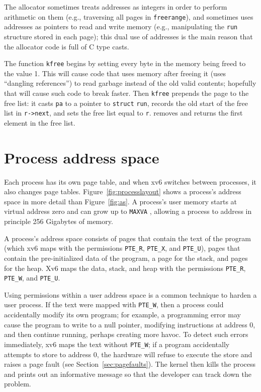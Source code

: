 The allocator sometimes treats addresses as integers
in order to perform arithmetic on them (e.g.,
traversing all pages in
\lstinline{freerange}),
and sometimes uses addresses as pointers to read and
write memory (e.g., manipulating the
\lstinline{run}
structure stored in each page);
this dual use of addresses is the main reason that the
allocator code is full of C type casts.

The function
\lstinline{kfree}
begins by setting every byte in the
memory being freed to the value 1.
This will cause code that uses memory after freeing it
(uses ``dangling references'')
to read garbage instead of the old valid contents;
hopefully that will cause such code to break faster.
Then
\lstinline{kfree}
prepends the page to the free list:
it casts
\lstinline{pa}
to a pointer to
\lstinline{struct}
\lstinline{run},
records the old start of the free list in
\lstinline{r->next},
and sets the free list equal to
\lstinline{r}.
removes and returns the first element in the free list.

\section{Process address space}

Each process has its own page table, and when xv6 switches between
processes, it also changes page tables.
Figure~\ref{fig:processlayout} shows a process's address space in more
detail than Figure~\ref{fig:as}.  A process's user memory starts at
virtual address zero and can grow up to \texttt{MAXVA}
, allowing a process to address in
principle 256 Gigabytes of memory.

A process's address space consists of pages that contain the text of
the program (which xv6 maps with the permissions \lstinline{PTE_R},
\lstinline{PTE_X}, and \lstinline{PTE_U}), pages that contain the
pre-initialized data of the program, a page for the stack, and pages
for the heap.  Xv6 maps the data, stack, and heap with the permissions
\lstinline{PTE_R}, \lstinline{PTE_W}, and \lstinline{PTE_U}.

Using permissions within a user address space is a common technique to
harden a user process.  If the text were mapped with
\lstinline{PTE_W}, then a process could accidentally modify its own
program; for example, a programming error may cause the program to
write to a null pointer, modifying instructions at address 0, and then
continue running, perhaps creating more havoc.  To detect such errors
immediately, xv6 maps the text without \lstinline{PTE_W}; if a program
accidentally attempts to store to address 0, the hardware will refuse
to execute the store and raises a page fault (see
Section~\ref{sec:pagefaults}).  The kernel then kills the process and
prints out an informative message so that the developer can track down
the problem.

